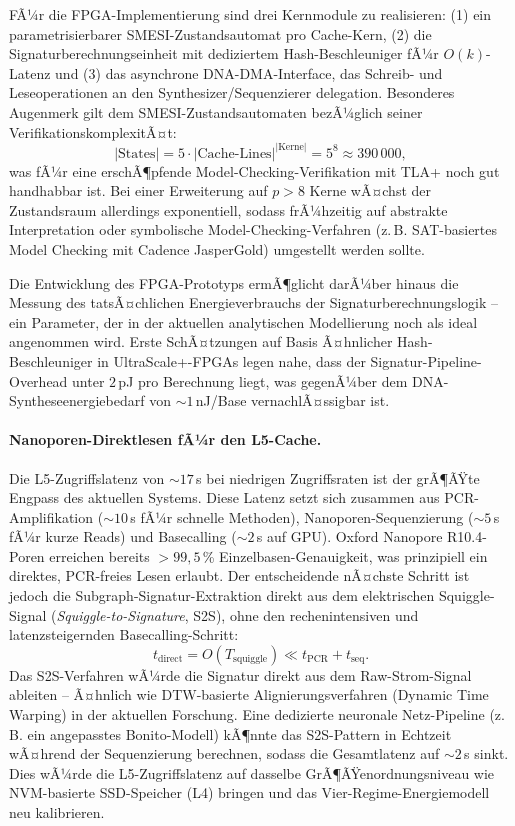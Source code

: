 ﻿\documentclass[a4paper,12pt]{article}
\theoremstyle{definition}
\begin{document}
FÃ¼r die FPGA-Implementierung sind drei Kernmodule zu realisieren: (1) ein parametrisierbarer SMESI-Zustandsautomat pro Cache-Kern, (2) die Signaturberechnungseinheit mit dediziertem Hash-Beschleuniger fÃ¼r $O(k)$-Latenz und (3) das asynchrone DNA-DMA-Interface, das Schreib- und Leseoperationen an den Synthesizer/Sequenzierer delegation. Besonderes Augenmerk gilt dem SMESI-Zustands\-automaten bezÃ¼glich seiner VerifikationskomplexitÃ¤t:
\[
  |\mathrm{States}| = 5 \cdot |\text{Cache-Lines}|^{|\text{Kerne}|}
  = 5^8 \approx 390\,000,
\]
was fÃ¼r eine erschÃ¶pfende Model-Checking-Verifikation mit TLA+ noch gut handhabbar ist. Bei einer Erweiterung auf $p > 8$ Kerne wÃ¤chst der Zustandsraum allerdings exponentiell, sodass frÃ¼hzeitig auf abstrakte Interpretation oder symbolische Model-Checking-Verfahren (z.\,B. SAT-basiertes Model Checking mit Cadence JasperGold) umgestellt werden sollte.

Die Entwicklung des FPGA-Prototyps ermÃ¶glicht darÃ¼ber hinaus die Messung des tatsÃ¤chlichen Energieverbrauchs der Signaturberechnungslogik -- ein Parameter, der in der aktuellen analytischen Modellierung noch als ideal angenommen wird. Erste SchÃ¤tzungen auf Basis Ã¤hnlicher Hash-Beschleuniger in UltraScale+-FPGAs legen nahe, dass der Signatur-Pipeline-Overhead unter $2$\,pJ pro Berechnung liegt, was gegenÃ¼ber dem DNA-Syntheseenergiebedarf von $\sim 1$\,nJ/Base vernachlÃ¤ssigbar ist.

\paragraph{Nanoporen-Direktlesen fÃ¼r den L5-Cache.}
Die L5-Zugriffslatenz von $\sim 17$\,s bei niedrigen Zugriffsraten ist der grÃ¶ÃŸte Engpass des aktuellen Systems. Diese Latenz setzt sich zusammen aus PCR-Amplifikation ($\sim 10$\,s fÃ¼r schnelle Methoden), Nanoporen-Sequenzierung ($\sim 5$\,s fÃ¼r kurze Reads) und Basecalling ($\sim 2$\,s auf GPU). Oxford Nanopore R10.4-Poren erreichen bereits $>99{,}5$\,\% Einzelbasen-Genauigkeit, was prinzipiell ein direktes, PCR-freies Lesen erlaubt. Der entscheidende nÃ¤chste Schritt ist jedoch die Subgraph-Signatur-Extraktion direkt aus dem elektrischen Squiggle-Signal (\emph{Squiggle-to-Signature}, S2S), ohne den rechenintensiven und latenzsteigernden Basecalling-Schritt:
\begin{equation}
  t_{\mathrm{direct}} = O(T_{\mathrm{squiggle}}) \ll t_{\mathrm{PCR}} + t_{\mathrm{seq}}.
\end{equation}
Das S2S-Verfahren wÃ¼rde die Signatur direkt aus dem Raw-Strom-Signal ableiten -- Ã¤hnlich wie DTW-basierte Alignierungsverfahren (Dynamic Time Warping) in der aktuellen Forschung. Eine dedizierte neuronale Netz-Pipeline (z.\,B. ein angepasstes Bonito-Modell) kÃ¶nnte das S2S-Pattern in Echtzeit wÃ¤hrend der Sequenzierung berechnen, sodass die Gesamtlatenz auf $\sim 2$\,s sinkt. Dies wÃ¼rde die L5-Zugriffslatenz auf dasselbe GrÃ¶ÃŸenordnungsniveau wie NVM-basierte SSD-Speicher (L4) bringen und das Vier-Regime-Energiemodell neu kalibrieren.
\end{document}
